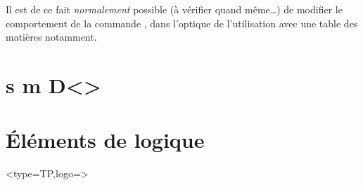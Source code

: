 \documentclass[french,11pt,a4paper]{article}
\begin{document}
\begin{DemoCode}{}
\end{DemoCode}

\begin{DemoCode}{}
\end{DemoCode}

\begin{DemoCode}{}
\end{DemoCode}

\begin{DemoCode}{}
\end{DemoCode}

\begin{DemoCode}{}
\end{DemoCode}

Il est de ce fait \textit{normalement} possible (à vérifier quand même\ldots) de modifier le comportement de la commande , dans l'optique de l'utilisation avec une table des matières notamment.

\begin{DemoCode}{}
\RenewDocumentCommand\part{ s m D<>{} }{%
	\addtocounter{part}{1}%
		{%
		}%
		{%
		}%
}
\renewcommand\thepart{\ifnum\value{part}<10\relax0\fi\arabic{part}}

\part{Éléments de logique}<type=TP,logo=\faAirbnb>
\end{DemoCode}
\end{document}
